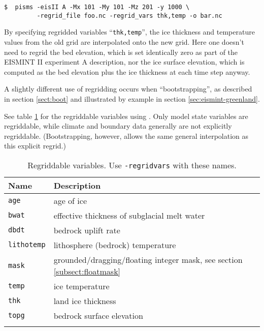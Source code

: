 \begin{verbatim}
$  pisms -eisII A -Mx 101 -My 101 -Mz 201 -y 1000 \
         -regrid_file foo.nc -regrid_vars thk,temp -o bar.nc
\end{verbatim}
\noindent By specifying regridded variables ``\verb|thk,temp|'', the ice thickness and temperature values from the old grid are interpolated onto the new grid.  Here one doesn't need to regrid the bed elevation, which is set identically zero as part of the EISMINT II experiment A description, nor the ice surface elevation, which is computed as the bed elevation plus the ice thickness at each time step anyway.

A slightly different use of regridding occurs when ``bootstrapping'', as described in section \ref{sect:boot} and illustrated by example in section \ref{sec:eismint-greenland}.

See table \ref{tab:regridvar} for the regriddable variables using
\intextoption{regrid\und file}.  Only model state variables are regriddable, while climate and boundary data generally are not explicitly regriddable.  (Bootstrapping, however, allows the same general interpolation as this explicit regrid.)

\begin{table}[ht]
\centering
\caption{Regriddable variables.  Use \texttt{-regrid\und vars} with these names.}\label{tab:regridvar}
\begin{tabular}{ll}\hline
\textbf{Name} & \textbf{Description}\\ \hline
\texttt{age} & age of ice\\
\texttt{bwat} & effective thickness of subglacial melt water \\
\texttt{dbdt} & bedrock uplift rate \\
\texttt{litho\und temp} & lithosphere (bedrock) temperature \\
\texttt{mask} & grounded/dragging/floating integer mask, see section \ref{subsect:floatmask} \\
\texttt{temp} & ice temperature \\
\texttt{thk} & land ice thickness \\
\texttt{topg} & bedrock surface elevation \\
\hline
\normalsize
\end{tabular}
\end{table}

